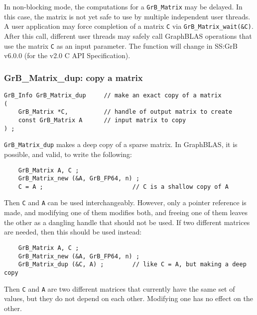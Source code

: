 \documentclass[12pt]{article}
\begin{document}
In non-blocking mode, the computations for a \verb'GrB_Matrix' may be delayed.
In this case, the matrix is not yet safe to use by multiple independent user
threads.  A user application may force completion of a matrix \verb'C' via
\verb'GrB_Matrix_wait(&C)'.  After this call, different user threads may safely
call GraphBLAS operations that use the matrix \verb'C' as an input parameter.
The function will change in SS:GrB v6.0.0 (for the v2.0 C API Specification).

\subsubsection{{\sf GrB\_Matrix\_dup:}          copy a matrix}
\label{matrix_dup}

\begin{mdframed}[userdefinedwidth=6in]
{\footnotesize
\begin{verbatim}
GrB_Info GrB_Matrix_dup     // make an exact copy of a matrix
(
    GrB_Matrix *C,          // handle of output matrix to create
    const GrB_Matrix A      // input matrix to copy
) ;
\end{verbatim} } \end{mdframed}

\verb'GrB_Matrix_dup' makes a deep copy of a sparse matrix.
In GraphBLAS, it is possible, and valid, to write the following:

    {\footnotesize
    \begin{verbatim}
    GrB_Matrix A, C ;
    GrB_Matrix_new (&A, GrB_FP64, n) ;
    C = A ;                         // C is a shallow copy of A  \end{verbatim}}

Then \verb'C' and \verb'A' can be used interchangeably.  However, only a
pointer reference is made, and modifying one of them modifies both, and freeing
one of them leaves the other as a dangling handle that should not be used.  If
two different matrices are needed, then this should be used instead:

    {\footnotesize
    \begin{verbatim}
    GrB_Matrix A, C ;
    GrB_Matrix_new (&A, GrB_FP64, n) ;
    GrB_Matrix_dup (&C, A) ;        // like C = A, but making a deep copy \end{verbatim}}

Then \verb'C' and \verb'A' are two different matrices that currently have the
same set of values, but they do not depend on each other.  Modifying one has
no effect on the other.
\end{document}
